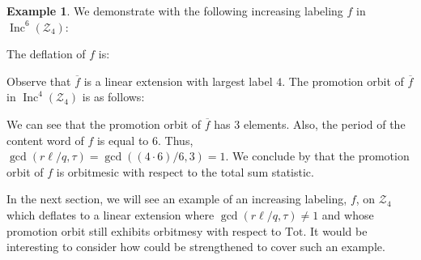 \documentclass[11pt]{amsart}
\theoremstyle{definition}
\newtheorem{example}[theorem]{Example}
\newcommand{\tot}{\mathrm{Tot}}
\DeclareMathOperator{\Inc}{\mathrm{Inc}}
\newcommand{\calZ}{\mathcal{Z}}
\begin{document}
\begin{example}\label{ex:linear_ext}
We demonstrate  with the following increasing labeling $f$ in $\Inc^6(\calZ_4)$:
\begin{center}
\end{center}

The deflation of $f$ is:
\begin{center}
\end{center}
Observe that $\overline{f}$ is a linear extension with largest label $4$. The promotion orbit of $\overline{f}$ in $\Inc^4(\calZ_4)$ is as follows:
\begin{center}
\end{center}

We can see that the promotion orbit of $\overline{f}$ has 3 elements. Also, the period of the content word of $f$ is equal to $6$.
Thus, $\gcd(r\ell/q,\tau) = \gcd((4\cdot 6)/6, 3) = 1$.
We conclude by  that the promotion orbit of $f$ is orbitmesic with respect to the total sum statistic. 
\end{example}

 
In the next section, we will see an example of an increasing labeling, $f$, on $\calZ_4$ which deflates to a linear extension where $\gcd(r\ell/q,\tau) \ne 1$ and  whose promotion orbit  still exhibits orbitmesy with respect to $\tot$.  It would be interesting to consider how  could be strengthened to cover such an example. 
\end{document}
